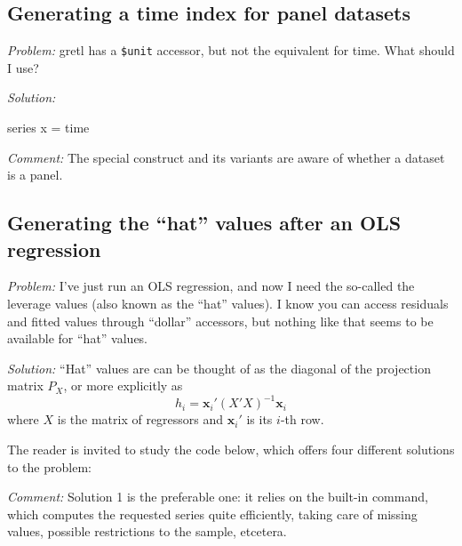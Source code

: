\subsection{Generating a time index for panel datasets}

\emph{Problem:} gretl has a \texttt{\$unit} accessor, but not
the equivalent for time. What should I use?

\emph{Solution:}
\begin{code}
series x = time
\end{code}

\emph{Comment:} The special construct  and its variants
are aware of whether a dataset is a panel.


\subsection{Generating the ``hat'' values after an OLS regression}

\emph{Problem:} I've just run an OLS regression, and now I need the
so-called the leverage values (also known as the ``hat'' values). I
know you can access residuals and fitted values through ``dollar''
accessors, but nothing like that seems to be available for ``hat''
values.

\emph{Solution:}
``Hat'' values are can be thought of as the diagonal of the projection
matrix $P_X$, or more explicitly as
\[
h_i = \mathbf{x}_i' (X'X)^{-1} \mathbf{x}_i 
\]
where $X$ is the matrix of regressors and $\mathbf{x}_i'$ is its
$i$-th row.

The reader is invited to study the code below, which offers four
different solutions to the problem:
 

\emph{Comment:} Solution 1 is the preferable one: it relies on the
built-in  command, which computes the requested series
quite efficiently, taking care of missing values, possible
restrictions to the sample, etcetera.

